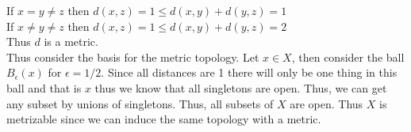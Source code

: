 \documentclass[12pt, letterpaper]{article}
\theoremstyle{definition}
\begin{document}
\begin{enumerate}[(a)]
\begin{itemize}
        If $x=y\neq z$ then $d(x,z)=1 \leq d(x,y)+d(y,z)=1$\\
        If $x \neq y \neq z$ then $d(x,z)=1 \leq d(x,y)+d(y,z)=2$\\
        Thus $d$ is a metric.\\
        Thus consider the basis for the metric topology. Let $x \in X$, then consider the ball $B_\epsilon(x)$ for $\epsilon = 1/2$. Since all distances are 1 there will only be one thing in this ball and that is $x$ thus we know that all singletons are open. Thus, we can get any subset by unions of singletons. Thus, all subsets of $X$ are open. Thus $X$ is metrizable since we can induce the same topology with a metric.
    \end{itemize}
\end{enumerate}
\end{document}
